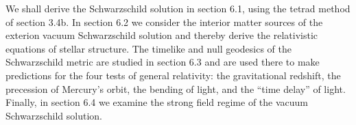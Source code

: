 We shall derive the Schwarzschild solution in section 6.1, using the tetrad method of section 3.4b. In section 6.2 we consider the interior matter sources of the exterion vacuum Schwarzschild solution and thereby derive the relativistic equations of stellar structure. The timelike and null geodesics of the Schwarzschild metric are studied in section 6.3 and are used there to make predictions for the four tests of general relativity: the gravitational redshift, the precession of Mercury's orbit, the bending of light, and the ``time delay'' of light. Finally, in section 6.4 we examine the strong field regime of the vacuum Schwarzschild solution.


% 